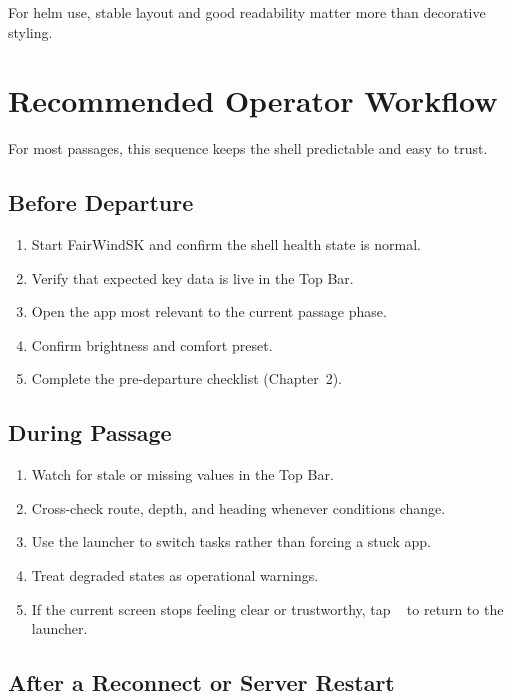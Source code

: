 For helm use, stable layout and good readability matter more than decorative styling.

\chapter{Recommended Operator Workflow}
\label{ch:workflow}

For most passages, this sequence keeps the shell predictable and easy to trust.

\section{Before Departure}

\begin{enumerate}
  \item Start FairWindSK and confirm the shell health state is normal.
  \item Verify that expected key data is live in the Top Bar.
  \item Open the app most relevant to the current passage phase.
  \item Confirm brightness and comfort preset.
  \item Complete the pre-departure checklist (Chapter~2).
\end{enumerate}

\section{During Passage}

\begin{enumerate}
  \item Watch for stale or missing values in the Top Bar.
  \item Cross-check route, depth, and heading whenever conditions change.
  \item Use the launcher to switch tasks rather than forcing a stuck app.
  \item Treat degraded states as operational warnings.
  \item If the current screen stops feeling clear or trustworthy, tap
        ~ to return to the launcher.
\end{enumerate}

\section{After a Reconnect or Server Restart}

